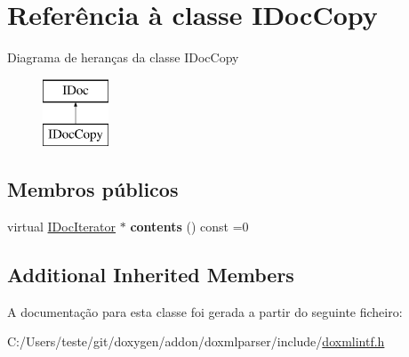 \hypertarget{class_i_doc_copy}{\section{Referência à classe I\-Doc\-Copy}
\label{class_i_doc_copy}
}
Diagrama de heranças da classe I\-Doc\-Copy\begin{figure}[H]
\begin{center}
\leavevmode
\includegraphics[height=2.000000cm]{class_i_doc_copy}
\end{center}
\end{figure}
\subsection*{Membros públicos}
\begin{DoxyCompactItemize}
\item 
\hypertarget{class_i_doc_copy_aff89b69139ea695b04d666fe2c1f963b}{virtual \hyperlink{class_i_doc_iterator}{I\-Doc\-Iterator} $\ast$ {\bfseries contents} () const =0}\label{class_i_doc_copy_aff89b69139ea695b04d666fe2c1f963b}

\end{DoxyCompactItemize}
\subsection*{Additional Inherited Members}


A documentação para esta classe foi gerada a partir do seguinte ficheiro\-:\begin{DoxyCompactItemize}
\item 
C\-:/\-Users/teste/git/doxygen/addon/doxmlparser/include/\hyperlink{include_2doxmlintf_8h}{doxmlintf.\-h}\end{DoxyCompactItemize}
